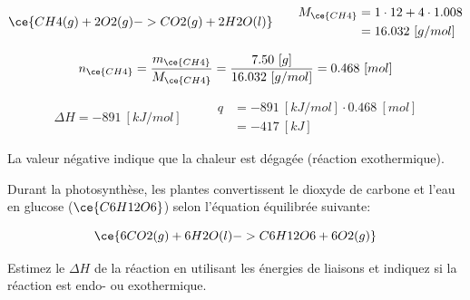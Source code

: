 \documentclass[
  11pt,
  a4paper,
  openany]{book}
\begin{document}
\begin{Answer}
\[
\begin{split}
\ce{CH4(g) + 2 O2(g) -> CO2(g) + 2 H2O(l)}
\end{split}
\qquad
\begin{split}
M_{\ce{CH4}} &= 1 \cdot 12 + 4 \cdot 1.008 \\
&= 16.032\ [g/mol]
\end{split}
\]

\[
n_{\ce{CH4}} = \frac{m_{\ce{CH4}}}{M_{\ce{CH4}}} = \frac{7.50\ [g]}{16.032\ [g/mol]} = 0.468\ [mol]
\]

\[
\begin{split}
\Delta H = -891\ [kJ/mol]
\end{split}
\qquad
\begin{split}
q &= -891\ [kJ/mol] \cdot 0.468\ [mol] \\
&= -417\ [kJ]
\end{split}
\]

La valeur négative indique que la chaleur est dégagée (réaction exothermique).

\end{Answer}

\begin{Exercise}

Durant la photosynthèse, les plantes convertissent le dioxyde de carbone et l'eau en glucose (\(\ce{C6H12O6}\)) selon l'équation équilibrée suivante:

\[
\ce{6 CO2(g) + 6 H2O(l) -> C6H12O6 + 6 O2(g)}
\]

Estimez le \(\Delta H\) de la réaction en utilisant les énergies de liaisons et indiquez si la réaction est endo- ou exothermique.


\end{Exercise}
\end{document}

